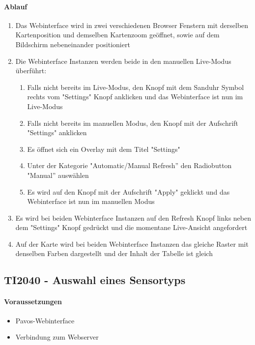 \paragraph{Ablauf}
\begin{enumerate}
\item Das Webinterface wird in zwei verschiedenen Browser Fenstern mit derselben Kartenposition und demselben Kartenzoom geöffnet, sowie auf dem Bildschirm nebeneinander positioniert
\item Die Webinterface Instanzen werden beide in den manuellen Live-Modus überführt:
\begin{enumerate}
\item Falls nicht bereits im Live-Modus, den Knopf mit dem Sanduhr Symbol rechts vom "Settings" Knopf anklicken und das Webinterface ist nun im Live-Modus
\item Falls nicht bereits im manuellen Modus, den Knopf mit der Aufschrift "Settings" anklicken
\item Es öffnet sich ein Overlay mit dem Titel "Settings"
\item Unter der Kategorie "Automatic/Manual Refresh'' den Radiobutton "Manual'' auswählen
\item Es wird auf den Knopf mit der Aufschrift "Apply" geklickt und das Webinterface ist nun im manuellen Modus
\end{enumerate} 
\item Es wird bei beiden Webinterface Instanzen auf den Refresh Knopf  links neben dem "Settings" Knopf gedrückt und die momentane Live-Ansicht angefordert
\item Auf der Karte wird bei beiden Webinterface Instanzen das gleiche Raster mit denselben Farben dargestellt und der Inhalt der Tabelle ist gleich
\end{enumerate}
\szenarioGood

\subsection{TI2040 - Auswahl eines Sensortyps}
\paragraph{Voraussetzungen}
\begin{itemize}
\item Pavos-Webinterface
\item Verbindung zum Webserver
\end{itemize}

